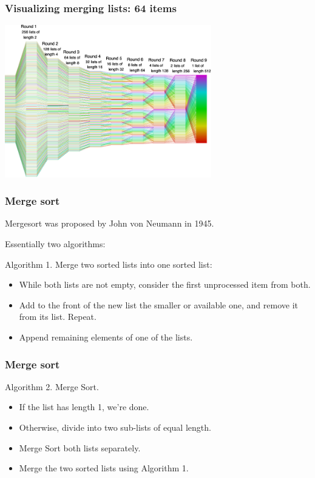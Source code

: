 \documentclass{beamer} %
\begin{document}
\begin{frame}
  \frametitle{Visualizing merging lists: 64 items}
  \centering
  \includegraphics[width=90mm]{assets/mergesort2.pdf}
\end{frame}

\begin{frame}
\frametitle{Merge sort}

Mergesort was proposed by John von Neumann in 1945.

\vspace{3mm}
Essentially two algorithms:

\vspace{5mm}
Algorithm 1. Merge two sorted lists into one sorted list:
\begin{itemize}
\item While both lists are not empty, consider the first unprocessed item from both.
\item Add to the front of the new list the smaller or available one, and remove it from its list. Repeat.
\item Append remaining elements of one of the lists.
\end{itemize}

\end{frame}

\begin{frame}
\frametitle{Merge sort}

Algorithm 2. Merge Sort.
\begin{itemize}
\item If the list has length 1, we're done.
\item Otherwise, divide into two sub-lists of equal length.
\item Merge Sort both lists separately.
\item Merge the two sorted lists using Algorithm 1.
\end{itemize}

\end{frame}
\end{document}
